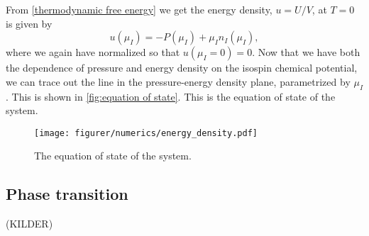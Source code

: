 From \cref{thermodynamic free energy} we get the energy density, $u = U/V$, at $T = 0$ is given by
\begin{equation}
    u(\mu_I) = -P(\mu_I) + \mu_I n_I(\mu_I),
\end{equation}
where we again have normalized so that $u(\mu_I = 0) = 0$.
Now that we have both the dependence of pressure and energy density on the isospin chemical potential, we can trace out the line in the pressure-energy density plane, parametrized by $\mu_I$.
This is shown in \autoref{fig:equation of state}.
This is the equation of state of the system.

\begin{figure}[!h]
    \centering
    \vspace{-0.2cm}
    \texttt{[image: figurer/numerics/energy\_density.pdf]}
    \caption{The equation of state of the system.}
    \label{fig:equation of state}
\end{figure}

\FloatBarrier

\subsection*{Phase transition}
(KILDER)

